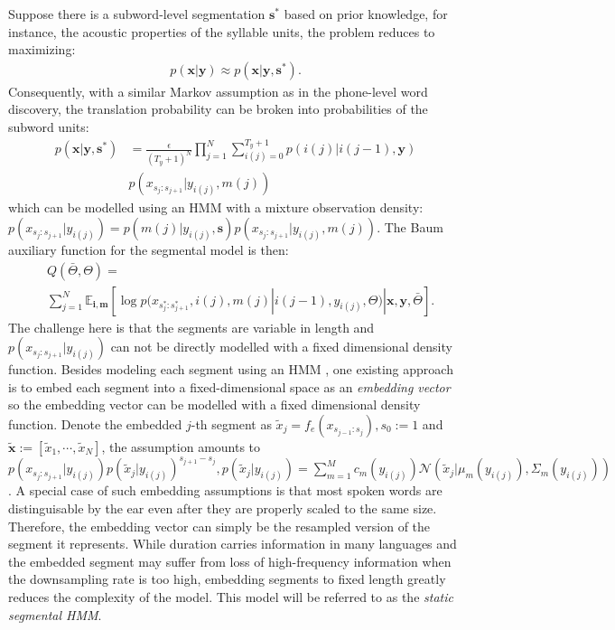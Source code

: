 \documentclass[journal]{IEEEtran}
\begin{document}
Suppose there is a subword-level segmentation $\mathbf s^*$ based on prior knowledge, for instance, the acoustic properties of the syllable units, the problem reduces to maximizing:
\begin{align}\label{eq:trans_prob_preseg_simplified}
   p(\mathbf x|\mathbf y) \approx p(\mathbf x|\mathbf y, \mathbf s^*). 
\end{align}
Consequently, with a similar Markov assumption as in the phone-level word discovery, the translation probability can be broken into probabilities of the subword units:
\begin{align*}
    p(\mathbf x|\mathbf y, \mathbf s^*) &= \frac{\epsilon}{(T_y+1)^N}\prod_{j=1}^{N} \sum_{i(j)=0}^{T_y+1}p(i(j)|i(j-1), \mathbf y)\nonumber\\ &p(x_{s_j:s_{j+1}}|y_{i(j)}, m(j))    
\end{align*}
which can be modelled using an HMM with a mixture observation density: $p(x_{s_j:s_{j+1}}|y_{i(j)}) = p(m(j)|y_{i(j)}, \mathbf s) p(x_{s_j:s_{j+1}}|y_{i(j)}, m(j))$. The Baum auxiliary function for the segmental model is then:
\begin{align}\label{eq:baum_subword_hmm}
    &Q(\bar{\Theta}, \Theta) = \nonumber\\
    & \sum_{j=1}^N \mathbb{E}_{\mathbf i, \mathbf m}[\log p(x_{s_j^*:s_{j+1}^*}, i(j), m(j)|i(j-1), y_{i(j)}, \Theta)|\mathbf x, \mathbf y, \bar{\Theta}].
\end{align}
The challenge here is that the segments are variable in length and $p(x_{s_j:s_{j+1}}|y_{i(j)})$ can not be directly modelled with a fixed dimensional density function. Besides modeling each segment using an HMM \cite{Lee2012}, one existing approach \cite{Kamper2017} is to embed each segment into a fixed-dimensional space as an \textit{embedding vector} so the embedding vector can be modelled with a fixed dimensional density function. Denote the embedded $j$-th segment as $\tilde{x}_j = f_e(x_{s_{j-1}:s_j}), s_0:=1$ and $\tilde{\mathbf x} := [\tilde{x}_1, \cdots, \tilde{x}_N]$, the assumption amounts to $p(x_{s_j:s_{j+1}}|y_{i(j)}) p(\tilde{x}_j|y_{i(j)})^{s_{j+1}-s_j}, p(\tilde{x}_j|y_{i(j)}) = \sum_{m=1}^M c_m(y_{i(j)})\mathcal N(\tilde{x}_j|\mu_m(y_{i(j)}), \Sigma_m(y_{i(j)}))$. A special case of such embedding assumptions is that most spoken words are distinguisable by the ear even after they are properly scaled to the same size. Therefore, the embedding vector can simply be the resampled version of the segment it represents. While duration carries information in many languages and the embedded segment may suffer from loss of high-frequency information when the downsampling rate is too high, embedding segments to fixed length greatly reduces the complexity of the model. This model will be referred to as the \textit{static segmental HMM}.
\end{document}
